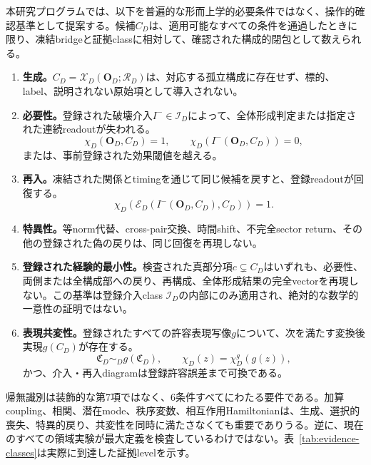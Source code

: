 \documentclass[11pt,a4paper]{article}
\begin{document}
本研究プログラムでは、以下を普遍的な形而上学的必要条件ではなく、操作的確認基準として提案する。候補$C_D$は、適用可能なすべての条件を通過したときに限り、凍結bridgeと証拠classに相対して、確認された構成的閉包として数えられる。
\begin{enumerate}
  \item \textbf{生成。}$C_D=\mathcal X_D(\mathbf O_D;\mathcal R_D)$は、対応する孤立構成に存在せず、標的、label、説明されない原始項として導入されない。
  \item \textbf{必要性。}登録された破壊介入$I^-\in\mathcal I_D$によって、全体形成判定または指定された連続readoutが失われる。
  \begin{equation}
    \chi_D(\mathbf O_D,C_D)=1,
    \qquad
    \chi_D\!\left(I^-(\mathbf O_D,C_D)\right)=0,
    \label{eq:necessity}
  \end{equation}
  または、事前登録された効果閾値を越える。
  \item \textbf{再入。}凍結された関係とtimingを通じて同じ候補を戻すと、登録readoutが回復する。
  \begin{equation}
    \chi_D\!\left(\mathcal E_D(I^-(\mathbf O_D,C_D),C_D)\right)=1.
    \label{eq:reentry-condition}
  \end{equation}
  \item \textbf{特異性。}等norm代替、cross-pair交換、時間shift、不完全sector return、その他の登録された偽の戻りは、同じ回復を再現しない。
  \item \textbf{登録された経験的最小性。}検査された真部分項$c\subsetneq C_D$はいずれも、必要性、両側または全構成部への戻り、再構成、全体形成結果の完全vectorを再現しない。この基準は登録介入class $\mathcal I_D$の内部にのみ適用され、絶対的な数学的一意性の証明ではない。
  \item \textbf{表現共変性。}登録されたすべての許容表現写像$g$について、次を満たす変換後実現$g(C_D)$が存在する。
  \begin{equation}
     \mathfrak C_D\sim_D g(\mathfrak C_D),
     \qquad
     \chi_D(z)=\chi_D^{g}(g(z)),
     \label{eq:covariance-condition}
  \end{equation}
  かつ、介入・再入diagramは登録許容誤差まで可換である。
\end{enumerate}

帰無識別は装飾的な第7項ではなく、6条件すべてにわたる要件である。加算coupling、相関、潜在mode、秩序変数、相互作用Hamiltonianは、生成、選択的喪失、特異的戻り、共変性を同時に満たさなくても重要でありうる。逆に、現在のすべての領域実験が最大定義を検査しているわけではない。表~\ref{tab:evidence-classes}は実際に到達した証拠levelを示す。
\end{document}
